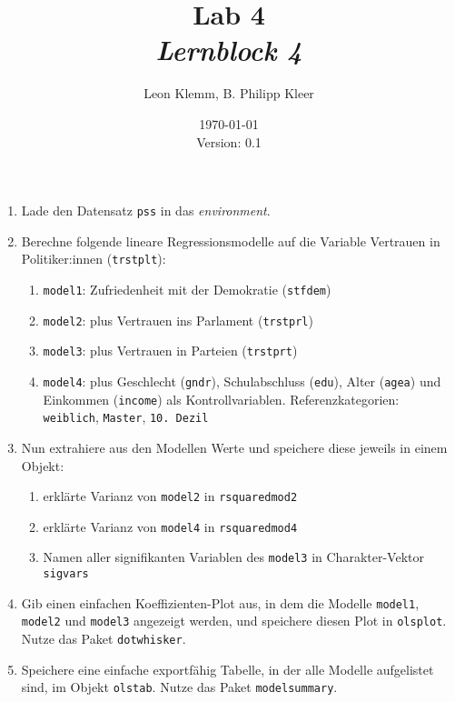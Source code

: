 \documentclass[12pt,a4paper]{article}
\title{Lab 4 \\ \normalsize \textit{Lernblock 4}}
\author{Leon Klemm, B. Philipp Kleer}
\date{\today \\ \small{Version: 0.1}}
\begin{document}
\maketitle

\begin{enumerate}
	\item Lade den Datensatz \texttt{pss} in das \textit{environment}.		
	\item Berechne folgende lineare Regressionsmodelle auf die Variable Vertrauen in Politiker:innen (\texttt{trstplt}):
	\begin{enumerate}
		\item \texttt{model1}: Zufriedenheit mit der Demokratie (\texttt{stfdem})
		\item \texttt{model2}: plus Vertrauen ins Parlament (\texttt{trstprl})
		\item \texttt{model3}: plus Vertrauen in Parteien (\texttt{trstprt})
		\item \texttt{model4}: plus Geschlecht (\texttt{gndr}), Schulabschluss (\texttt{edu}), Alter (\texttt{agea}) und Einkommen (\texttt{income}) als Kontrollvariablen. Referenzkategorien: \texttt{weiblich}, \texttt{Master}, \texttt{10. Dezil}
	\end{enumerate}
	\item Nun extrahiere aus den Modellen Werte und speichere diese jeweils in einem Objekt:
	\begin{enumerate}
		\item erklärte Varianz von \texttt{model2} in \texttt{rsquaredmod2}
        \item erklärte Varianz von \texttt{model4} in \texttt{rsquaredmod4}
        \item Namen aller signifikanten Variablen des \texttt{model3} in Charakter-Vektor \texttt{sigvars}
	\end{enumerate}
	 \item Gib einen einfachen Koeffizienten-Plot aus, in dem die Modelle \texttt{model1}, \texttt{model2} und \texttt{model3} angezeigt werden, und speichere diesen Plot in \texttt{olsplot}. Nutze das Paket \texttt{dotwhisker}.
	 \item Speichere eine einfache exportfähig Tabelle, in der alle Modelle aufgelistet sind, im Objekt \texttt{olstab}. Nutze das Paket \texttt{modelsummary}.
\end{enumerate}
\end{document}
